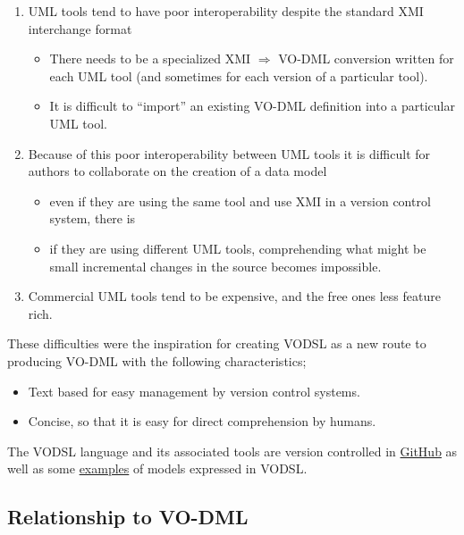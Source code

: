\documentclass[11pt,a4paper]{ivoa}
\begin{document}
\begin{enumerate}
\item UML tools tend to have poor interoperability despite the standard XMI interchange format \begin{itemize}
  \item There needs to be a specialized XMI $\Rightarrow$ VO-DML conversion written for each UML tool (and sometimes for each version of a particular tool).
  \item It is difficult to ``import'' an existing VO-DML definition into a particular UML tool.
\end{itemize}
\item Because of this poor interoperability between UML tools it is difficult for authors to collaborate on the creation of a data model \begin{itemize}
  \item even if they are using the same tool and use XMI in a version control system, there is
  \item if they are using different UML tools, comprehending what might be small incremental changes in the source becomes impossible.
\end{itemize}
\item Commercial UML tools tend to be expensive, and the free ones less feature rich.
\end{enumerate}

These difficulties were the inspiration for creating VODSL as a new route to producing VO-DML with the following characteristics;
\begin{itemize}
\item Text based for easy management by version control systems.
\item Concise, so that it is easy for direct comprehension by humans.
\end{itemize}

The VODSL language and its associated tools are version controlled in \href{https://github.com/pahjbo/vodsl}{GitHub} as well
as some \href{https://github.com/ivoa/vodsl-models}{examples} of 
models expressed in VODSL.

\subsection{Relationship to VO-DML}
\label{sec:relation}
\end{document}
